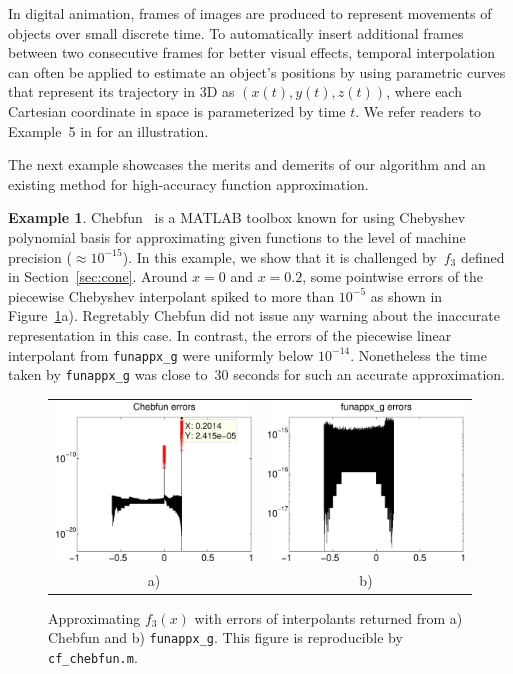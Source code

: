 \documentclass[review]{elsarticle}
\theoremstyle{definition}
\newtheorem{exmp}{Example}
\newcommand{\funappxg}{\texttt{funappx\_g\xspace}}
\begin{document}
In digital animation, frames of images are produced to represent movements of
objects over small discrete time. To automatically insert additional frames between
two consecutive frames for better visual effects, temporal
interpolation can often be applied to estimate an object's positions by using
parametric curves that represent its trajectory in 3D as $(x(t), y(t), z(t))$,
where each Cartesian coordinate in space is parameterized by time $t$. We refer
readers to Example~5 in \cite[Chapter~3, Section~6]{Din15a} for an illustration.


The next example showcases the merits and demerits of our algorithm and an
existing method for high-accuracy function approximation.

\begin{exmp}
Chebfun~\cite{TrefEtal16a} is a MATLAB toolbox known for using Chebyshev
polynomial basis for approximating given functions to the level of machine
precision ($\approx 10^{-15}$). In this example, we show that it is challenged
by~$f_3$ defined in Section~\ref{sec:cone}. Around $x=0$ and $x=0.2$, some
pointwise errors of the piecewise Chebyshev interpolant spiked to more than
$10^{-5}$ as shown in Figure~\ref{f3chebfig}a). Regretably Chebfun did not issue
any warning about the inaccurate representation in this case. In contrast, the
errors of the piecewise linear interpolant from \funappxg{} were uniformly below
$10^{-14}$. Nonetheless the time taken by \funappxg{} was close to~30 seconds
for such an accurate approximation.

%
\begin{figure}[tbh]
\centering
\begin{tabular}{cc}
\includegraphics[width=5.9cm]{figure/chebfun_errors.eps} \hspace{-2ex} &
\includegraphics[width=5.9cm]{figure/funappx_g_errors.eps}
\\ a) & b)
\end{tabular}
\caption{Approximating $f_3(x)$ with errors of interpolants returned from a)
Chebfun and b) \funappxg. This figure is reproducible by
\texttt{cf\_chebfun.m}. \label{f3chebfig}}
\end{figure}
%

\end{exmp}
\end{document}
